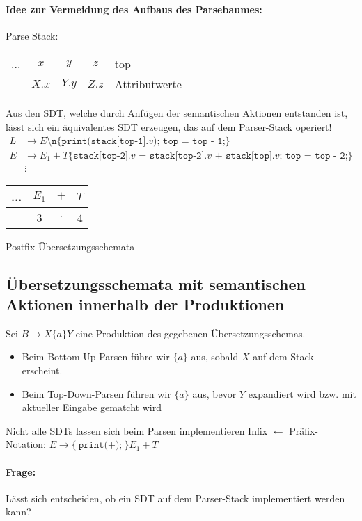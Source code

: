 \paragraph*{Idee zur Vermeidung des Aufbaus des Parsebaumes:}
Parse Stack:
\begin{center}
    \begin{tabular}{cc|c|c|l}\cline{1-4}
        ... & $x$   & $y$   & $z$   & top\\\cline{1-4}
            & $X.x$ & $Y.y$ & $Z.z$ & Attributwerte\\\cline{1-4}
    \end{tabular}
\end{center}
Aus den SDT, welche durch Anfügen der semantischen Aktionen entstanden ist, lässt sich ein äquivalentes SDT erzeugen, das auf dem Parser-Stack operiert!
\begin{align*}
    L &\to E\texttt{\textbackslash n} \{\texttt{print(stack[top-1]}.v\texttt{); top = top - 1;}\} \\
    E &\to E_1 + T \{\texttt{stack[top-2]}.v\texttt{ = stack[top-2]}.v\texttt{ + stack[top]}.v\texttt{; top = top - 2;}\} \\
    &\vdots
\end{align*}
\begin{center}
    \begin{tabular}{cc|c|c|}\hline
        ... & $E_1$   & $+$   & $T$\\\hline
            & 3 & $\cdot$ & 4 \\\hline
    \end{tabular}
\end{center}
Postfix-Übersetzungsschemata
\subsection{Übersetzungsschemata mit semantischen Aktionen innerhalb der Produktionen}
Sei $B \to X \{a\} Y$ eine Produktion des gegebenen Übersetzungsschemas.
\begin{itemize}
\item   Beim Bottom-Up-Parsen führe wir $\{a\}$ aus, sobald $X$ auf dem Stack erscheint.
\item   Beim Top-Down-Parsen führen wir $\{a\}$ aus, bevor $Y$ expandiert wird bzw. mit aktueller Eingabe gematcht wird
\end{itemize}
Nicht alle SDTs lassen sich beim Parsen implementieren
\Bsp Infix $\longleftarrow$ Präfix-Notation: $E \to \{\texttt{print($+$);}\} E_1 + T$
\paragraph*{Frage:} Lässt sich entscheiden, ob ein SDT auf dem Parser-Stack implementiert werden kann?
